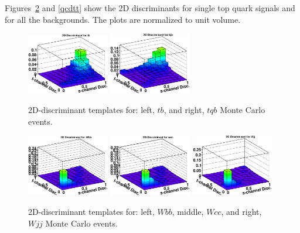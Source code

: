 Figures~\ref{wbbwccwjj} and \ref{qcdtt} show the 2D discriminants
for single top quark signals and for all the backgrounds. The
plots are normalized to unit volume.

\clearpage

\begin{figure}[!h!tbp]
\includegraphics[width=0.32\textwidth]
{figures/performance/2D-Discriminant_schannel}
\includegraphics[width=0.32\textwidth]
{figures/performance/2D-Discriminant_tchannel}
\vspace{-0.1in}
\caption[tbtqwbbwcc]{2D-discriminant templates for: left, $tb$, and
right, $tqb$ Monte Carlo events.}
\label{tbtqb}
\end{figure}

\begin{figure}[!h!tbp]
\includegraphics[width=0.32\textwidth]
{figures/performance/2D-Discriminant_wbb}
\includegraphics[width=0.32\textwidth]
{figures/performance/2D-Discriminant_wcc}
\includegraphics[width=0.32\textwidth]
{figures/performance/2D-Discriminant_wjj}
\vspace{-0.1in}
\caption[tbtqwbbwcc]{2D-discriminant templates for: left,
$Wbb$, middle, $Wcc$, and right, $Wjj$ Monte Carlo events.}
\label{wbbwccwjj}
\end{figure}

